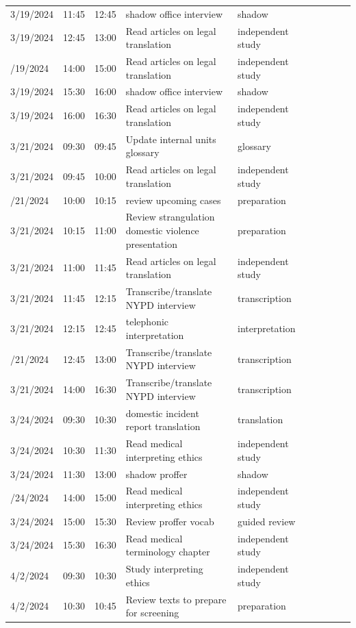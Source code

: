 \documentclass{article}
\begin{document}
\begin{longtable}{lp{1.8cm} l p{5cm} l p{1.5cm} l p{5cm} l p{5cm}}
3/19/2024 & 11:45 & 12:45 & shadow office interview & shadow\\
3/19/2024 & 12:45 & 13:00 & Read articles on legal translation & independent study\\
\addlinespace
3/19/2024 & 14:00 & 15:00 & Read articles on legal translation & independent study\\
3/19/2024 & 15:30 & 16:00 & shadow office interview & shadow\\
3/19/2024 & 16:00 & 16:30 & Read articles on legal translation & independent study\\
3/21/2024 & 09:30 & 09:45 & Update internal units glossary & glossary\\
3/21/2024 & 09:45 & 10:00 & Read articles on legal translation & independent study\\
\addlinespace
3/21/2024 & 10:00 & 10:15 & review upcoming cases & preparation\\
3/21/2024 & 10:15 & 11:00 & Review strangulation domestic violence presentation & preparation\\
3/21/2024 & 11:00 & 11:45 & Read articles on legal translation & independent study\\
3/21/2024 & 11:45 & 12:15 & Transcribe/translate NYPD interview & transcription\\
3/21/2024 & 12:15 & 12:45 & telephonic interpretation & interpretation\\
\addlinespace
3/21/2024 & 12:45 & 13:00 & Transcribe/translate NYPD interview & transcription\\
3/21/2024 & 14:00 & 16:30 & Transcribe/translate NYPD interview & transcription\\
3/24/2024 & 09:30 & 10:30 & domestic incident report translation & translation\\
3/24/2024 & 10:30 & 11:30 & Read medical interpreting ethics & independent study\\
3/24/2024 & 11:30 & 13:00 & shadow proffer & shadow\\
\addlinespace
3/24/2024 & 14:00 & 15:00 & Read medical interpreting ethics & independent study\\
3/24/2024 & 15:00 & 15:30 & Review proffer vocab & guided review\\
3/24/2024 & 15:30 & 16:30 & Read medical terminology chapter & independent study\\
4/2/2024 & 09:30 & 10:30 & Study interpreting ethics & independent study\\
4/2/2024 & 10:30 & 10:45 & Review texts to prepare for screening & preparation\\

\end{longtable}
\end{document}
